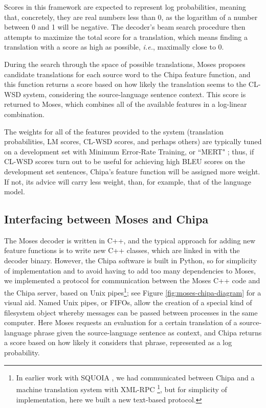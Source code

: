 Scores in this framework are expected to represent log probabilities, meaning
that, concretely, they are real numbers less than 0, as the logarithm of a
number between 0 and 1 will be negative. The decoder's beam search procedure
then attempts to maximize the total score for a translation, which means
finding a translation with a score as high as possible, \emph{i.e.}, maximally
close to 0.

During the search through the space of possible translations, Moses proposes
candidate translations for each source word to the Chipa feature function, and
this function returns a score based on how likely the translation seems to the
CL-WSD system, considering the source-language sentence context. This score is
returned to Moses, which combines all of the available features in a log-linear
combination.

The weights for all of the features provided to the system (translation
probabilities, LM scores, CL-WSD scores, and perhaps others) are typically
tuned on a development set with Minimum Error-Rate Training, or ``MERT"
\cite{och:2003:ACL}; thus, if CL-WSD scores turn out to be useful for achieving
high BLEU scores on the development set sentences, Chipa's feature function
will be assigned more weight. If not, its advice will carry less weight, than,
for example, that of the language model.

\subsection{Interfacing between Moses and Chipa}
The Moses decoder is written in C++, and the typical approach for adding new
feature functions is to write new C++ classes, which are linked in with the
decoder binary. However, the Chipa software is built in Python, so for
simplicity of implementation and to avoid having to add too many dependencies
to Moses, we implemented a protocol for communication between the Moses C++
code and the Chipa server, based on Unix pipes\footnote{In earlier work with
SQUOIA \cite{rudnick:saltmil2014}, we had communicated between Chipa and a
machine translation system with XML-RPC
\footnote{\url{http://xmlrpc.scripting.com/}}, but for simplicity of
implementation, here we built a new text-based protocol.}; see Figure
\ref{fig:moses-chipa-diagram} for a visual aid. Named Unix pipes, or FIFOs,
allow the creation of a special kind of filesystem object whereby messages can
be passed between processes in the same computer. Here Moses requests an
evaluation for a certain translation of a source-language phrase given the
source-language sentence as context, and Chipa returns a score based on how
likely it considers that phrase, represented as a log probability.

